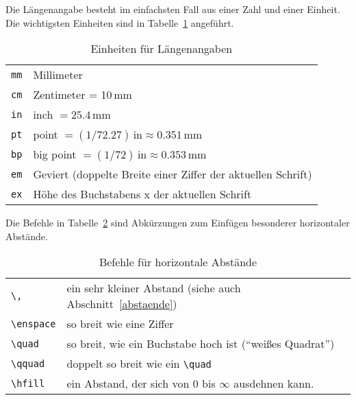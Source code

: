 Die Längenangabe besteht im einfachsten Fall aus einer Zahl
und einer Einheit.  Die wichtigsten Einheiten sind in
Tabelle~\ref{units} angeführt.
\begin{table}[!htb]
\caption{Einheiten für Längenangaben} \label{units}
\centering
\def\arraystretch{1.25}
\begin{tabular}{@{}ll@{}}
\toprule
\texttt{mm} & Millimeter                               \\
\texttt{cm} & Zentimeter = 10\,mm                            \\
\texttt{in} & inch $= 25.4\,\mathrm{mm} $                 \\
\texttt{pt} & point $ =(1/72.27)\,\mathrm{in}
                        \approx 0.351\,\mathrm{mm}$         \\
\texttt{bp} & big point $ =(1/72)\,\mathrm{in}
                            \approx 0.353\,\mathrm{mm} $     \\
\texttt{em}  &  Geviert (doppelte Breite einer Ziffer der aktuellen Schrift)\\
\texttt{ex}   & Höhe des Buchstabens x der aktuellen Schrift \\
\bottomrule
\end{tabular}
\end{table}

Die Befehle in Tabelle~\ref{hspace} sind Abkürzungen zum Einfügen
besonderer horizontaler Abstände.

\begin{table}[!htb]
\caption{Befehle für horizontale Abstände} \label{hspace}
\centering
\def\arraystretch{1.25}
\begin{tabular}{@{}ll@{}}
\toprule
\lstinline|\,|       & ein sehr kleiner Abstand (siehe auch Abschnitt~\ref{abstaende})\\
\lstinline|\enspace| & so breit wie eine Ziffer \\
\lstinline|\quad|    & so breit, wie ein Buchstabe hoch ist
                   ("`weißes Quadrat"') \\
\lstinline|\qquad|   & doppelt so breit wie ein \lstinline|\quad| \\
\lstinline|\hfill|   & ein Abstand, der sich von 0 bis \(\infty\)
                   ausdehnen kann. \\
\bottomrule
\end{tabular}
\end{table}

